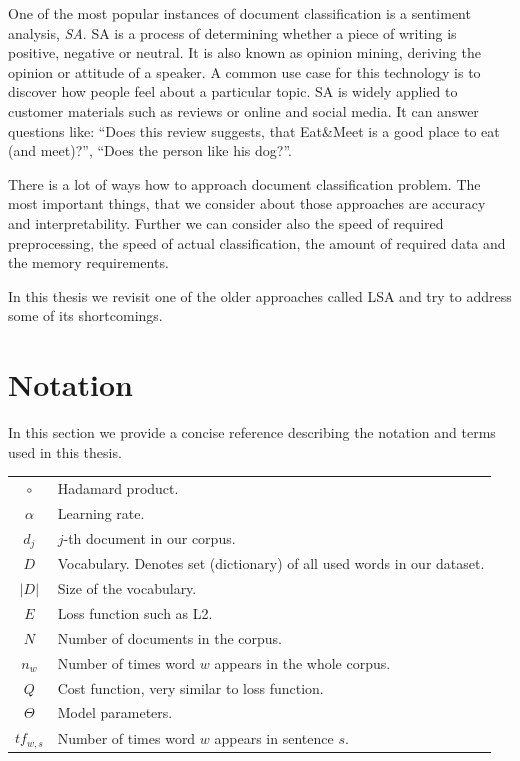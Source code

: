     One of the most popular instances of document classification is a sentiment analysis, \emph{SA}.
    SA is a process of determining whether a piece of writing is positive, negative or neutral.
    It is also known as opinion mining, deriving the opinion or attitude of a speaker. 
    A common use case for this technology is to discover how people feel about a particular topic.
    SA is widely applied to customer materials such as reviews or online and social media.
    It can answer questions like: ``Does this review suggests, that Eat\&Meet is a good place to eat (and meet)?'', ``Does the person like his dog?''.
    
    There is a lot of ways how to approach document classification problem. 
    The most important things, that we consider about those approaches are accuracy and interpretability.
    Further we can consider also the speed of required preprocessing, the speed of actual classification, the amount of required data and the memory requirements. 
    
    In this thesis we revisit one of the older approaches called LSA and try to address some of its shortcomings.
    
    \* %

\section{Notation}

    In this section we provide a concise reference describing the notation and terms used in this thesis.
    
    \begin{table}[h]
        \centering
        \begin{tabular}{c l}
            $\circ$ & Hadamard product. \\
            $\alpha$ & Learning rate. \\
            $d_j$ & $j$-th document in our corpus.\\
            $D$ & Vocabulary. Denotes set (dictionary) of all used words in our dataset. \\
            $|D|$ & Size of the vocabulary. \\
            $E$ & Loss function such as L2.\\
            $N$ & Number of documents in the corpus. \\
            $n_w$ & Number of times word $w$ appears in the whole corpus. \\
            $Q$ & Cost function, very similar to loss function.\\
            $\Theta$ & Model parameters.\\
            $tf_{w,s}$ & Number of times word $w$ appears in sentence $s$. \\
            
        \end{tabular}
    \end{table}
    
